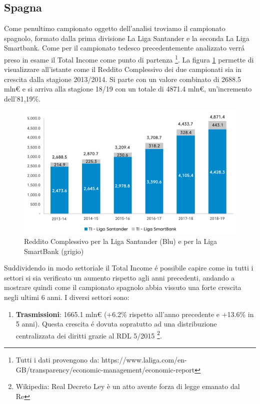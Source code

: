 \documentclass[
    corpo=11.5pt,
    oneside,
    evenboxes,
    tipotesi=triennale,
    stile=classica,
    oldstyle,
    autoretitolo,
    greek,
]{toptesi}
\begin{document}
\begin{interlinea}{1.5}
\subsection{Spagna}
Come penultimo campionato oggetto dell'analisi troviamo il campionato spagnolo, formato dalla prima divisione La Liga Santander e la seconda
La Liga Smartbank. Come per il campionato tedesco precedentemente analizzato verr\'a preso in esame il Total Income come punto di partenza
\footnote{Tutti i dati provengono da: https://www.laliga.com/en-GB/transparency/economic-management/economic-report}.
La figura \ref{total_income_spain} permette di visualizzare all'istante come il Reddito Complessivo dei due campionati sia in crescita 
dalla stagione 2013/2014. Si parte con un valore combinato di 2688.5 mln€ e si arriva alla stagione 18/19 con un totale di 4871.4 mln€, 
un'incremento dell'81,19\%. 
\begin{figure}
    \centering
    \includegraphics[scale=0.5]{img/total_income_spain.png}
    \caption{Reddito Complessivo per la Liga Santander (Blu) e per la Liga SmartBank (grigio)}
    \label{total_income_spain}
\end{figure}
Suddividendo in modo settoriale il Total Income \'e possibile capire come in tutti i settori si sia verificato un aumento rispetto agli anni
precedenti, andando a mostrare quindi come il campionato spagnolo abbia vissuto una forte crescita negli ultimi 6 anni.
I diversi settori sono:
\begin{enumerate}
    \item \textbf{Trasmissioni}: 1665.1 mln€ (+6.2\% rispetto all'anno precedente e +13.6\% in 5 anni). Questa crescita \'e dovuta sopratutto ad una distribuzione 
    centralizzata dei diritti grazie al RDL 5/2015 \footnote{Wikipedia: Real Decreto Ley è un atto avente forza di legge emanato dal Re}.

\end{enumerate}
\end{interlinea}
\end{document}
